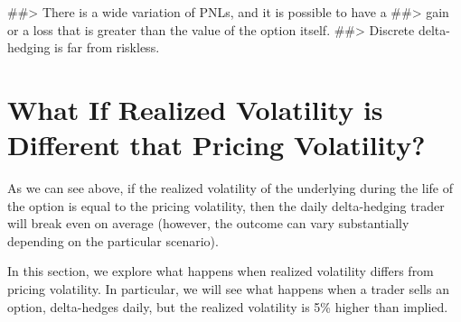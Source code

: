 \documentclass[
  letterpaper,
  DIV=11,
  numbers=noendperiod]{scrreprt}
\newenvironment{Shaded}{\begin{snugshade}}{\end{snugshade}}
\newcommand{\CommentTok}[1]{\textcolor[rgb]{0.37,0.37,0.37}{#1}}
\begin{document}
\begin{Shaded}
\begin{Highlighting}[]
\CommentTok{\#\#\textgreater{} There is a wide variation of PNLs, and it is possible to have a }
\CommentTok{\#\#\textgreater{} gain or a loss that is greater than the value of the option itself.}
\CommentTok{\#\#\textgreater{} Discrete delta{-}hedging is far from riskless.}
\end{Highlighting}
\end{Shaded}

\hypertarget{what-if-realized-volatility-is-different-that-pricing-volatility}{%
\section{What If Realized Volatility is Different that Pricing
Volatility?}\label{what-if-realized-volatility-is-different-that-pricing-volatility}}

As we can see above, if the realized volatility of the underlying during
the life of the option is equal to the pricing volatility, then the
daily delta-hedging trader will break even on average (however, the
outcome can vary substantially depending on the particular scenario).

In this section, we explore what happens when realized volatility
differs from pricing volatility. In particular, we will see what happens
when a trader sells an option, delta-hedges daily, but the realized
volatility is 5\% higher than implied.
\end{document}
